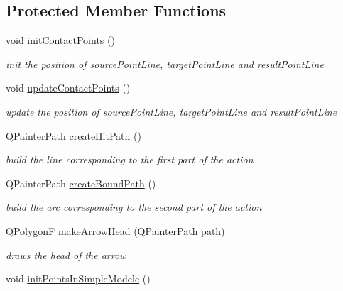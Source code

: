 \subsection*{Protected Member Functions}
\begin{DoxyCompactItemize}
\item 
\hypertarget{classGAction_a6509f55dc693f00abfc5d019ea244c89}{void \hyperlink{classGAction_a6509f55dc693f00abfc5d019ea244c89}{init\+Contact\+Points} ()}\label{classGAction_a6509f55dc693f00abfc5d019ea244c89}

\begin{DoxyCompactList}\small\item\em init the position of source\+Point\+Line, target\+Point\+Line and result\+Point\+Line \end{DoxyCompactList}\item 
\hypertarget{classGAction_ac3772b10309aa6afe0e64ba40c662fcc}{void \hyperlink{classGAction_ac3772b10309aa6afe0e64ba40c662fcc}{update\+Contact\+Points} ()}\label{classGAction_ac3772b10309aa6afe0e64ba40c662fcc}

\begin{DoxyCompactList}\small\item\em update the position of source\+Point\+Line, target\+Point\+Line and result\+Point\+Line \end{DoxyCompactList}\item 
Q\+Painter\+Path \hyperlink{classGAction_a86dc08d16a482755317f4c212a853068}{create\+Hit\+Path} ()
\begin{DoxyCompactList}\small\item\em build the line corresponding to the first part of the action \end{DoxyCompactList}\item 
Q\+Painter\+Path \hyperlink{classGAction_a682f47e5009ea5336579928215bc6391}{create\+Bound\+Path} ()
\begin{DoxyCompactList}\small\item\em build the arc corresponding to the second part of the action \end{DoxyCompactList}\item 
Q\+Polygon\+F \hyperlink{classGAction_a7144bb80f0de787a60d43340c8545163}{make\+Arrow\+Head} (Q\+Painter\+Path path)
\begin{DoxyCompactList}\small\item\em draws the head of the arrow \end{DoxyCompactList}\item 
\hypertarget{classGAction_a7aa759b10fae92f3052b8d5336641a03}{void \hyperlink{classGAction_a7aa759b10fae92f3052b8d5336641a03}{init\+Points\+In\+Simple\+Modele} ()}\label{classGAction_a7aa759b10fae92f3052b8d5336641a03}


\end{DoxyCompactItemize}
